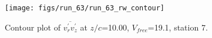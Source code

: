 \begin{figure}[H]
\centering
\texttt{[image: figs/run\_63/run\_63\_rw\_contour]}
\caption{Contour plot of $\overline{v_{r}^{\prime} v_{z}^{\prime}}$ at $z/c$=10.00, $V_{free}$=19.1, station 7.}
\label{fig:run_63_rw_contour}
\end{figure}


